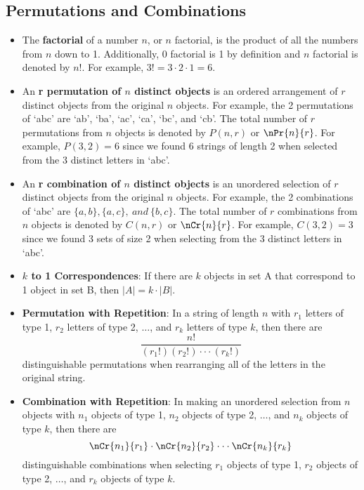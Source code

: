 \documentclass[letterpaper, 12pt]{math}
\begin{document}
\subsection*{Permutations and Combinations}
\begin{itemize}
  \item The \textbf{factorial} of a number \( n \), or \( n \) factorial, is
    the product of all the numbers from \( n \) down to 1. Additionally, 0
    factorial is 1 by definition and \( n \) factorial is denoted by \( n! \).
    For example, \( 3! = 3\cdot2\cdot1 = 6 \).
  \item An \textbf{r permutation of \( n \) distinct objects} is an ordered
    arrangement of \( r \) distinct objects from the original \( n \) objects.
    For example, the 2 permutations of `abc' are `ab', `ba', `ac', `ca', `bc',
    and `cb'. The total number of \( r \) permutations from \( n \) objects
    is denoted by \( P(n,r) \) or \( \nPr{n}{r} \). For example, \( P(3,2) = 6
    \) since we found 6 strings of length 2 when selected from the 3 distinct
    letters in `abc'.
  \item An \textbf{r combination of \( n \) distinct objects} is an unordered
    selection of \( r \) distinct objects from the original \( n \) objects.
    For example, the 2 combinations of `abc' are \( \{a,b\},\{a,c\},\ and\
    \{b,c\} \). The total number of \( r \) combinations from \( n \) objects
    is denoted by \( C(n,r) \) or \( \nCr{n}{r} \). For example, \( C(3,2) = 3
    \) since we found 3 sets of size 2 when selecting from the 3 distinct
    letters in `abc'.
  \item \textbf{\( k \) to 1 Correspondences}: If there are \( k \) objects in
    set A that correspond to 1 object in set B, then \( |A| = k\cdot|B| \).
  \item \textbf{Permutation with Repetition}: In a string of length \( n \)
    with \( r_{1} \) letters of type 1, \( r_{2} \) letters of type 2,
    \( \dots \), and \( r_{k} \) letters of type \( k \), then there are
    \[ \frac{n!}{(r_{1}!)(r_{2}!)\cdot\cdot\cdot(r_{k}!)} \]
    distinguishable permutations when rearranging all of the letters in the
    original string.
  \item \textbf{Combination with Repetition}: In making an unordered selection
    from \( n \) objects with \( n_{1} \) objects of type 1, \( n_{2} \) objects
    of type 2, \( \dots \), and \( n_{k} \) objects of type \( k \), then there
    are
    \[ \nCr{n_{1}}{r_{1}}\cdot\nCr{n_{2}}{r_{2}}\cdot\cdot\cdot
      \nCr{n_{k}}{r_{k}} \]
    distinguishable combinations when selecting \( r_{1} \) objects of type 1,
    \( r_{2} \) objects of type 2, \( \dots \), and \( r_{k} \) objects of type
    \( k \).
\end{itemize}
\end{document}
